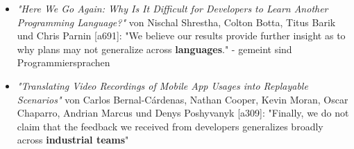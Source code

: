 \begin{itemize}
    \item \textit{"Here We Go Again: Why Is It Difficult for Developers to Learn Another Programming Language?"} von Nischal Shrestha, Colton Botta, Titus Barik und Chris Parnin [a691]: "We believe our results provide further insight as to why plans may not generalize across \textbf{languages}." - gemeint sind Programmiersprachen
    \item \textit{"Translating Video Recordings of Mobile App Usages into Replayable Scenarios"} von Carlos Bernal-Cárdenas, Nathan Cooper, Kevin Moran, Oscar Chaparro, Andrian Marcus und Denys Poshyvanyk [a309]: "Finally, we do not claim that the feedback we received from developers generalizes broadly across \textbf{industrial teams}"
\end{itemize}
